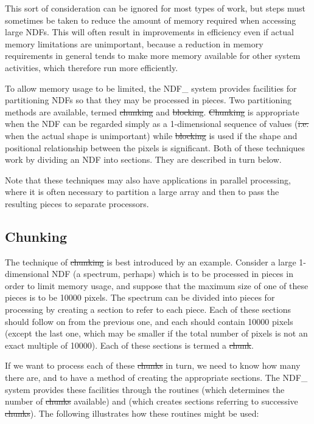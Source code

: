 This sort of consideration can be ignored for most types of work, but
steps must sometimes be taken to reduce the amount of memory required
when accessing large NDFs. This will often result in improvements in
efficiency even if actual memory limitations are unimportant, because a
reduction in memory requirements in general tends to make more memory
available for other system activities, which therefore run more
efficiently.

To allow memory usage to be limited, the NDF\_ system provides
facilities for partitioning NDFs so that they may be processed in
pieces. Two partitioning methods are available, termed \st{chunking\/}
and \st{blocking}. \st{Chunking\/} is appropriate when the NDF can be
regarded simply as a 1-dimensional sequence of values (\st{i.e.\/} when
the actual shape is unimportant) while \st{blocking\/} is used if the
shape and positional relationship between the pixels is significant.
Both of these techniques work by dividing an NDF into sections. They
are described in turn below.

Note that these techniques may also have applications in parallel
processing, where it is often necessary to partition a large array and
then to pass the resulting pieces to separate processors.

\subsection{Chunking}

The technique of \st{chunking\/} is best introduced by an example.
Consider a large \mbox{1-dimensional} NDF (a spectrum, perhaps) which is
to be processed in pieces in order to limit memory usage, and suppose
that the maximum size of one of these pieces is to be 10000 pixels. The
spectrum can be divided into pieces for processing by creating a section
to refer to each piece. Each of these sections should follow on from the
previous one, and each should contain 10000 pixels (except the last one,
which may be smaller if the total number of pixels is not an exact
multiple of 10000). Each of these sections is termed a \st{chunk}.

If we want to process each of these \st{chunks\/} in turn, we need to
know how many there are, and to have a method of creating the
appropriate sections. The NDF\_ system provides these facilities through
the routines  (which determines the number of \st{chunks\/}
available) and  (which creates sections referring to
successive \st{chunks\/}). The following illustrates how these routines
might be used:

